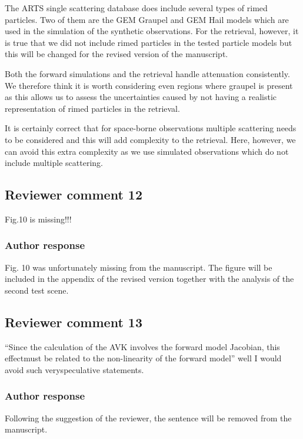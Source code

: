 \documentclass[11pt]{scrartcl}
\begin{document}
The ARTS single scattering database does include several types of rimed
particles. Two of them are the GEM Graupel and GEM Hail models which are used in
the simulation of the synthetic observations. For the retrieval, however, it is
true that we did not include rimed particles in the tested particle models but this
will be changed for the revised version of the manuscript.

Both the forward simulations and the retrieval handle attenuation consistently.
We therefore think it is worth considering even regions where graupel is present
as this allows us to assess the uncertainties caused by not having a realistic
representation of rimed particles in the retrieval.

It is certainly correct that for space-borne observations multiple scattering
needs to be considered and this will add complexity to the retrieval. Here,
however, we can avoid this extra complexity as we use simulated observations
which do not include multiple scattering.

\subsection*{Reviewer comment 12}

Fig.10 is missing!!!

\subsubsection*{Author response}

Fig. 10 was unfortunately missing from the manuscript. The figure will be included in the appendix
of the revised version together with the analysis of the second test scene.

\subsection*{Reviewer comment 13}
 “Since the calculation of the AVK involves the forward model Jacobian, this effectmust be related to the non-linearity of the forward model” well I would avoid such veryspeculative statements.

\subsubsection*{Author response}

Following the suggestion of the reviewer, the sentence will be removed from the manuscript.
\end{document}
